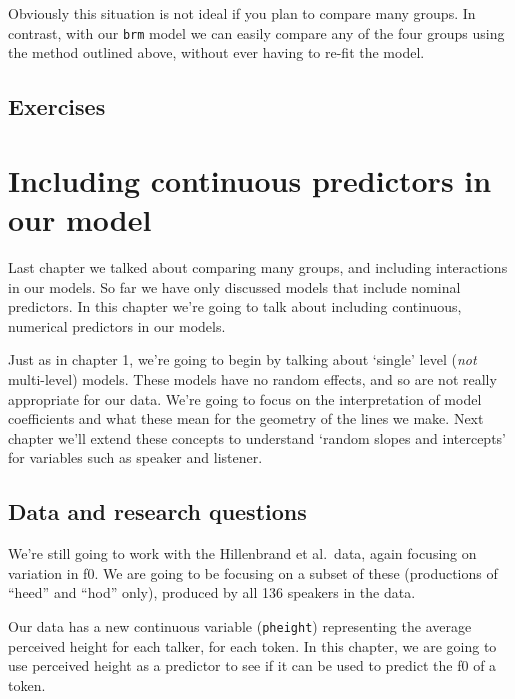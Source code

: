 \documentclass[
]{book}
\begin{document}
Obviously this situation is not ideal if you plan to compare many groups. In contrast, with our \texttt{brm} model we can easily compare any of the four groups using the method outlined above, without ever having to re-fit the model.

\hypertarget{exercises-3}{%
\section{Exercises}\label{exercises-3}}

\hypertarget{including-continuous-predictors-in-our-model}{%
\chapter{Including continuous predictors in our model}\label{including-continuous-predictors-in-our-model}}

Last chapter we talked about comparing many groups, and including interactions in our models. So far we have only discussed models that include nominal predictors. In this chapter we're going to talk about including continuous, numerical predictors in our models.

Just as in chapter 1, we're going to begin by talking about `single' level (\emph{not} multi-level) models. These models have no random effects, and so are not really appropriate for our data. We're going to focus on the interpretation of model coefficients and what these mean for the geometry of the lines we make. Next chapter we'll extend these concepts to understand `random slopes and intercepts' for variables such as speaker and listener.

\hypertarget{data-and-research-questions-4}{%
\section{Data and research questions}\label{data-and-research-questions-4}}

We're still going to work with the Hillenbrand et al.~data, again focusing on variation in f0. We are going to be focusing on a subset of these (productions of ``heed'' and ``hod'' only), produced by all 136 speakers in the data.

Our data has a new continuous variable (\texttt{pheight}) representing the average perceived height for each talker, for each token. In this chapter, we are going to use perceived height as a predictor to see if it can be used to predict the f0 of a token.
\end{document}
